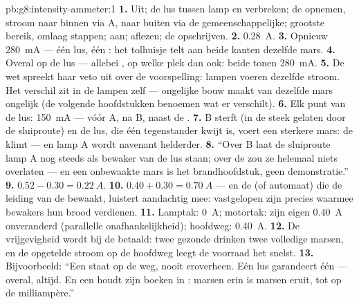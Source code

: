 \begin{solution}{pb:g8:intensity-ammeter:1}
\textbf{1.} Uit; de lus tussen lamp en  verbreken; de
 opnemen, stroom naar binnen via \unit{A}, naar buiten
via de gemeenschappelijke; grootste bereik, omlaag stappen; aan;
aflezen; de  opschrijven.
\textbf{2.} \qty{0.28}{A}.
\textbf{3.} Opnieuw \qty{280}{mA} --- één lus, één
: het tolhuisje telt aan beide kanten dezelfde
mars.
\textbf{4.} Overal op de lus --- allebei , op welke
plek dan ook: beide tonen \qty{280}{mA}.
\textbf{5.} De wet spreekt haar veto uit over de voorspelling: lampen
 voeren dezelfde stroom. Het verschil zit in de lampen zelf ---
ongelijke bouw maakt van dezelfde mars ongelijk  (de
volgende hoofdstukken benoemen wat er verschilt).
\textbf{6.} Elk punt van de lus: \qty{150}{mA} --- vóór A, na B, naast
de .
\textbf{7.} B sterft (in de steek gelaten door de sluiproute) en de
lus, die één tegenstander kwijt is, voert een sterkere mars: de 
klimt --- en lamp A wordt navenant helderder.
\textbf{8.} ``Over B laat de sluiproute lamp A nog steeds als bewaker
van de lus staan; over de  zou ze helemaal niets
overlaten --- en een onbewaakte mars is het brandhoofdstuk, geen
demonstratie.''
\textbf{9.} $0.52 - 0.30 = \qty{0.22}{A}$.
\textbf{10.} $0.40 + 0.30 = \qty{0.70}{A}$ --- en de
 (of automaat) die de leiding van de
 bewaakt, luistert aandachtig mee: vastgelopen
 zijn precies waarmee bewakers hun brood verdienen.
\textbf{11.} Lamptak: \qty{0}{A};
motortak: zijn eigen \qty{0.40}{A} onveranderd
(parallelle onafhankelijkheid); hoofdweg: \qty{0.40}{A}.
\textbf{12.} De vrijgevigheid wordt bij de  betaald: twee
gezonde  drinken twee volledige marsen, en de opgetelde
stroom op de hoofdweg leegt de voorraad het snelst.
\textbf{13.} Bijvoorbeeld: ``Een  staat op de weg,
nooit eroverheen. Eén lus garandeert één
 --- overal, altijd. En een
 houdt zijn boeken in : marsen erin is marsen
eruit, tot op de milliampère.''
\end{solution}
